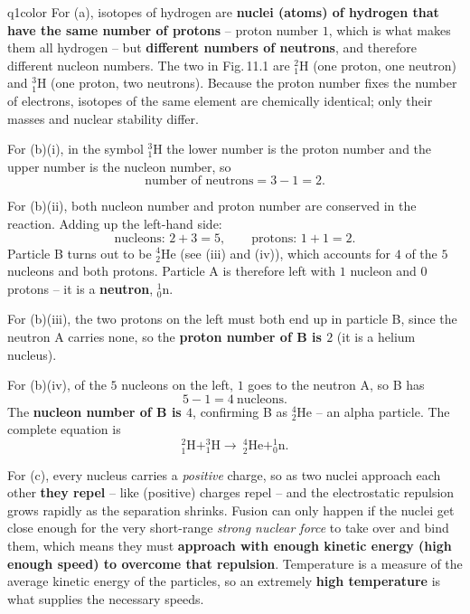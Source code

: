 \documentclass[11pt,a4paper]{article}
\begin{document}
\begin{ansbox}{q1color}
For (a), isotopes of hydrogen are \textbf{nuclei (atoms) of hydrogen that have the same number of protons} -- proton number $1$, which is what makes them all hydrogen -- but \textbf{different numbers of neutrons}, and therefore different nucleon numbers. The two in Fig.\,11.1 are $^{2}_{1}\mathrm{H}$ (one proton, one neutron) and $^{3}_{1}\mathrm{H}$ (one proton, two neutrons). Because the proton number fixes the number of electrons, isotopes of the same element are chemically identical; only their masses and nuclear stability differ.

For (b)(i), in the symbol $^{3}_{1}\mathrm{H}$ the lower number is the proton number and the upper number is the nucleon number, so
\[ \text{number of neutrons} = 3 - 1 = 2. \]

For (b)(ii), both nucleon number and proton number are conserved in the reaction. Adding up the left-hand side:
\[ \text{nucleons: } 2 + 3 = 5, \qquad \text{protons: } 1 + 1 = 2. \]
Particle B turns out to be $^{4}_{2}\mathrm{He}$ (see (iii) and (iv)), which accounts for $4$ of the $5$ nucleons and both protons. Particle A is therefore left with $1$ nucleon and $0$ protons -- it is a \textbf{neutron}, $^{1}_{0}\mathrm{n}$.

For (b)(iii), the two protons on the left must both end up in particle B, since the neutron A carries none, so the \textbf{proton number of B is $2$} (it is a helium nucleus).

For (b)(iv), of the $5$ nucleons on the left, $1$ goes to the neutron A, so B has
\[ 5 - 1 = 4 \ \text{nucleons}. \]
The \textbf{nucleon number of B is $4$}, confirming B as $^{4}_{2}\mathrm{He}$ -- an alpha particle. The complete equation is
\[ ^{2}_{1}\mathrm{H} + ^{3}_{1}\mathrm{H} \rightarrow\ ^{4}_{2}\mathrm{He} + ^{1}_{0}\mathrm{n}. \]

For (c), every nucleus carries a \emph{positive} charge, so as two nuclei approach each other \textbf{they repel} -- like (positive) charges repel -- and the electrostatic repulsion grows rapidly as the separation shrinks. Fusion can only happen if the nuclei get close enough for the very short-range \emph{strong nuclear force} to take over and bind them, which means they must \textbf{approach with enough kinetic energy (high enough speed) to overcome that repulsion}. Temperature is a measure of the average kinetic energy of the particles, so an extremely \textbf{high temperature} is what supplies the necessary speeds.


\end{ansbox}
\end{document}
